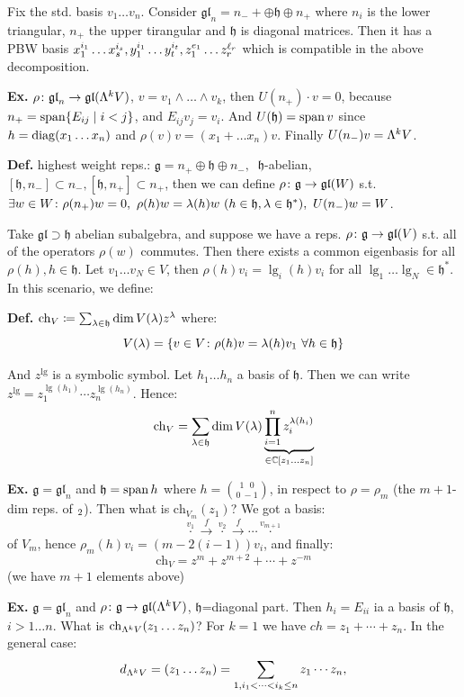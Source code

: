 \documentclass[]{../../../../tex/classes/styledArticle}
\newcommand\gl {\mathfrak{gl}}
\newcommand\g  {\mathfrak{g}}
\newcommand\Fi {\mathfrak{h}}
\newcommand\Fh {\mathfrak{h}}
\begin{document}
	Fix the std. basis $v_1 \dots v_n$. Consider $\gl_n = n_- + \oplus \Fi \oplus n_+$ where $n_i$ is the lower triangular, $n_+$ the upper tirangular and $\Fi$ is diagonal matrices. Then it has a PBW basis $x_1^{i_1} \dots x_s^{i_s}, y_1^{i_1} \dots y_t^{i_t}, z_1^{e_1} \dots z_r^{\ell_r}$ which is compatible in the above decomposition. 
	
	\textbf{Ex. }$\rho \co \gl_n \to \gl(\Lg^{k}V)$, $v = v_1 \land \dots \land v_k$, then $U(n_+)\cdot v = 0$, because $n_+ = \operatorname{span}\{E_{ij} \mid i < j\}$,  and $E_{ij}v_j = v_i$. And $U(\Fi) = \Sp v$ since $h = \operatorname{diag}(x_1 \dots x_n)$ and $\rho(v)v= (x_1 + \dots x_n)v$. Finally $U(n_-)v = \Lambda^{k}V$. 
	
	\textbf{Def. }highest weight reps.: $\g = n_+ \oplus \Fi \oplus n_-, \ $ $\Fi$-abelian, $[\Fi, n_-] \subset n_-, [\Fi, n_+] \subset n_+$, then we can define $\rho \co \g \to \gl(W)$ s.t. $\exists w \in W \co \rho(n_+)w = 0, \ \rho(h)w = \lg(h)w \ (h \in \Fi, \lg \in \Fi^*), \ U(n_-)w = W$. 
	
	Take $\gl \supset \Fi$ abelian subalgebra, and suppose we have a reps. $\rho \co \g \to \gl(V)$ s.t. all of the operators $\rho(w)$ commutes. Then there exists a common eigenbasis for all $\rho(h), h \in \Fh$. Let $v_1 \dots v_N \in V$, then $\rho(h)v_i = \lg_i(h)v_i$ for all $\lg_1 \dots \lg_N \in \Fh^*$. In this scenario, we define: 
	
	\textbf{Def. }$\mathrm{ch}_V \cod \sum_{\lg \in \Fh} \dim V(\lg)z^{\lg}$ where: 
	\[ V(\lg) = \ccb{v \in V \co \rho(h)v = \lg(h)v_1 \ \forall h \in \Fh} \]
	
	And $z^{\lg}$ is a symbolic symbol. Let $h_1 \dots h_n$ a basis of $\Fh$. Then we can write $z^{\lg} = z_1^{\lg(h_1)} \cdots z_n^{\lg(h_n)}$. Hence: 
	\[ \mathrm{ch}_V = \sum_{\lg \in \Fh} \dim V(\lg) \underbrace{\prod_{i = 1}^{n} z_i^{\lg(h_i)}}_{ \in \C[z_1 \dots z_n]} \]
	
	\textbf{Ex. }$\g = \gl_n$ and $\Fh = \Sp h$ where $ h = \binom{1 \ \ \ 0}{0 \ -1}$, in respect to $\rho = \rho_m$ (the $m + 1$-dim reps. of $\sl_2$). Then what is $\mathrm{ch}_{V_m}(z_1)$? We got a basis: 
	\[ \overset{v_1}{\cdot} \overset{f}{\to} \overset{v_2}{\cdot} \overset{f}{\to} \cdots \overset{v_{m + 1}}{\cdot} \]
	of $V_{m}$, hence $\rho_m(h)v_i = (m - 2(i - 1))v_i$, and finally: 
	\[ \mathrm{ch}_V = z^{m} + z^{m + 2} + \cdots + z^{-m} \]
	(we have $m + 1$ elements above)
	
	\textbf{Ex. }$\g =  \gl_n$ and $\rho \co \g \to \gl(\Lg^{k}V)$, $\Fh$=diagonal part. Then $h_i = E_{ii}$ ia a basis of $\Fi$, $i >  1\dots n$. What is $\mathrm{ch}_{\Lambda^{k}V}(z_1 \dots z_n)$? For $k = 1$ we have $ ch = z_1 + \cdots + z_n$. In the general case: 
	\[ d_{\Lambda^{k}V}=(z_1 \dots z_n) = \sum_{1 , i_1 < \cdots < i_k \le n }z_1 \cdots z_n, \] 
	
\end{document}
